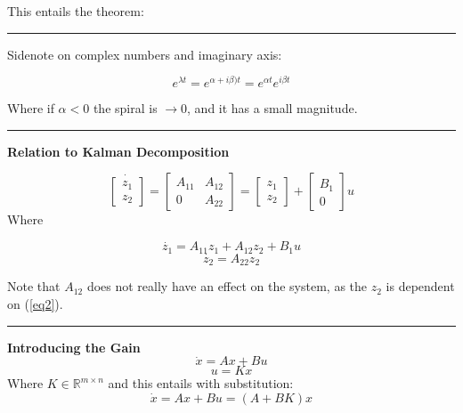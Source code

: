 \documentclass[a4paper]{article}
\begin{document}
This entails the theorem:
\begin{center}
\end{center}


\vspace{5pt}
\hrule
\vspace{5pt}
Sidenote on complex numbers and imaginary axis:

\begin{equation}
 e^{\lambda t} = e^{\alpha + i \beta)t} = e^{\alpha t} e^{i \beta t} 
\end{equation}

Where if $ \alpha < 0 $ the spiral is $ \rightarrow 0 $, and it has a small magnitude.

\vspace{5pt}
\hrule
\vspace{5pt}
\textbf{Relation to Kalman Decomposition} 

\begin{equation}
	\dot{\begin{bmatrix}
z_1 \\
z_2
\end{bmatrix}}  = \begin{bmatrix}
A_{11} & A_{12} \\
0 & A_{22}
\end{bmatrix} = \begin{bmatrix}
z_1 \\
z_2
\end{bmatrix} + \begin{bmatrix}
B_1 \\
0
\end{bmatrix} u
\end{equation}
Where

\begin{equation}
	\dot{z_1} = A_{11} z_1	 + A_{12} z_2 + B_1 u
\end{equation}
\begin{equation}\label{eq2}
	\dot{z_2} = A_{22} z_2
\end{equation}

Note that $ A_{12} $ does not really have an effect on the system, as the $ z_2 $ is dependent on (\ref{eq2}).

\vspace{5pt}
\hrule
\vspace{5pt}
\textbf{Introducing the Gain} 
\begin{equation}
\dot{x} = Ax + Bu
\end{equation}
\begin{equation}
u = Kx
\end{equation}
Where $ K \in \mathbb{R}^{m \times n} $  and this entails with substitution:
\begin{equation}
\dot{x} = Ax + Bu = (A+BK)x 
\end{equation}
\end{document}

